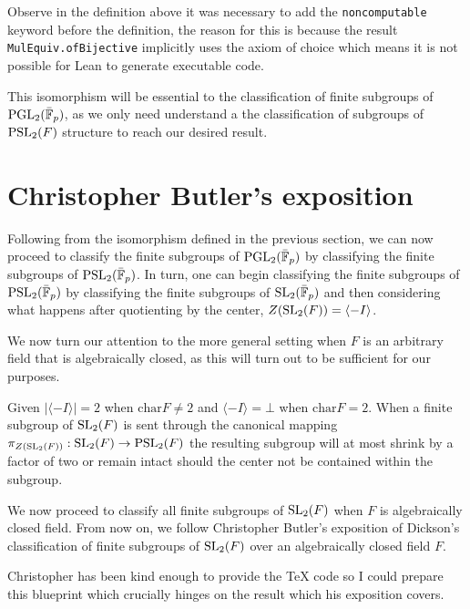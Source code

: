 \begin{remark}[Noncomputable]
    Observe in the definition above it was necessary to add the \texttt{noncomputable} keyword before the definition, the reason for this is
    because the result \texttt{MulEquiv.ofBijective} implicitly uses the axiom of choice which means it is not possible for Lean to generate
    executable code.
\end{remark}




This isomorphism will be essential to the classification of finite subgroups of $\operatorname{PGL}_2(\bar{\mathbb{F}}_p)$, as we only need understand a the classification of subgroups of $\operatorname{PSL}_2(F)$ structure to reach our desired result.


\section{Christopher Butler's exposition}

Following from the isomorphism defined in the previous section, we can now proceed to classify the finite subgroups of $\operatorname{PGL}_2(\bar{\mathbb{F}}_p)$ by classifying the finite subgroups of $\operatorname{PSL}_2(\bar{\mathbb{F}}_p)$. 
In turn, one can begin classifying the finite subgroups of $\operatorname{PSL}_2(\bar{\mathbb{F}}_p)$ by classifying the finite subgroups of $\operatorname{SL}_2(\bar{\mathbb{F}}_p)$ and then considering what happens after quotienting by the center, $Z(\operatorname{SL}_2(F)) = \langle -I\rangle$.

We now turn our attention to the more general setting when $F$ is an arbitrary field that is algebraically closed, as this will turn out to be sufficient for our purposes.

Given $|\langle -I \rangle| = 2$ when $\textrm{char} F \ne 2$ and $\langle -I\rangle = \bot$ when $\textrm{char} F = 2$.
When a finite subgroup of $\operatorname{SL}_2(F)$ is sent through the canonical mapping $\pi_{Z(\operatorname{SL}_2(F))} : \operatorname{SL}_2(F) \rightarrow \operatorname{PSL}_2(F)$ the resulting subgroup will at most shrink by a factor of two or remain intact should the center not be contained within the subgroup. 

We now proceed to classify all finite subgroups of $\operatorname{SL}_2(F)$ when $F$ is algebraically closed field. 
From now on, we follow Christopher Butler's exposition of Dickson's classification of finite subgroups of $\operatorname{SL}_2(F)$ over an algebraically closed field $F$. 

Christopher has been kind enough to provide the TeX code so I could prepare this blueprint which crucially hinges on the result which his exposition covers.